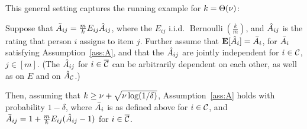 This general setting captures the running example for $k = \Theta(\nu)$:
\begin{proposition}
Suppose that $\tilde{A}_{ij} = \frac{m}{k}E_{ij}\hat{A}_{ij}$, 
where the $E_{ij}$ i.i.d. $\operatorname{Bernoulli}(\frac{k}{m})$, and 
$\hat{A}_{ij}$ is the rating that person $i$ assigns to item $j$. Further 
assume that $\mathbf{E}[\hat{A}_{i}] = \bar{A}_i$, for $\bar{A}_i$ satisfying 
Assumption~\ref{ass:A}, and that the $\hat{A}_{ij}$ are jointly independent 
for $i \in \mathcal{C}$, $j \in [m]$. (The $\hat{A}_{ij}$ for $i \in \overline{\mathcal{C}}$ can be 
arbitrarily dependent on each other, as well as on $E$ and on 
$\hat{A}_{\mathcal{C}}$.)

%

Then, assuming that $k \geq \nu + \sqrt{\nu \log(1/\delta)}$, 
Assumption~\ref{ass:A} holds with probability $1-\delta$, where $\bar{A}_i$ is 
as defined above for $i \in \mathcal{C}$, and 
$\bar{A}_{ij} = 1 + \frac{m}{k}E_{ij}(\hat{A}_{ij} - 1)$ for $i \in \overline{\mathcal{C}}$.
\end{proposition}
